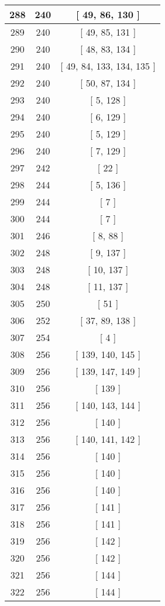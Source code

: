 \begin{center}
\begin{longtable}[H]{|| c c c ||}
\hline
288 & 240 & [ 49, 86, 130 ] \\ 
\hline
289 & 240 & [ 49, 85, 131 ] \\ 
\hline
290 & 240 & [ 48, 83, 134 ] \\ 
\hline
291 & 240 & [ 49, 84, 133, 134, 135 ] \\ 
\hline
292 & 240 & [ 50, 87, 134 ] \\ 
\hline
293 & 240 & [ 5, 128 ] \\ 
\hline
294 & 240 & [ 6, 129 ] \\ 
\hline
295 & 240 & [ 5, 129 ] \\ 
\hline
296 & 240 & [ 7, 129 ] \\ 
\hline
297 & 242 & [ 22 ] \\ 
\hline
298 & 244 & [ 5, 136 ] \\ 
\hline
299 & 244 & [ 7 ] \\ 
\hline
300 & 244 & [ 7 ] \\ 
\hline
301 & 246 & [ 8, 88 ] \\ 
\hline
302 & 248 & [ 9, 137 ] \\ 
\hline
303 & 248 & [ 10, 137 ] \\ 
\hline
304 & 248 & [ 11, 137 ] \\ 
\hline
305 & 250 & [ 51 ] \\ 
\hline
306 & 252 & [ 37, 89, 138 ] \\ 
\hline
307 & 254 & [ 4 ] \\ 
\hline
308 & 256 & [ 139, 140, 145 ] \\ 
\hline
309 & 256 & [ 139, 147, 149 ] \\ 
\hline
310 & 256 & [ 139 ] \\ 
\hline
311 & 256 & [ 140, 143, 144 ] \\ 
\hline
312 & 256 & [ 140 ] \\ 
\hline
313 & 256 & [ 140, 141, 142 ] \\ 
\hline
314 & 256 & [ 140 ] \\ 
\hline
315 & 256 & [ 140 ] \\ 
\hline
316 & 256 & [ 140 ] \\ 
\hline
317 & 256 & [ 141 ] \\ 
\hline
318 & 256 & [ 141 ] \\ 
\hline
319 & 256 & [ 142 ] \\ 
\hline
320 & 256 & [ 142 ] \\ 
\hline
321 & 256 & [ 144 ] \\ 
\hline
322 & 256 & [ 144 ] \\ 

\end{longtable}
\end{center}
